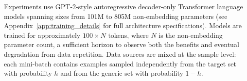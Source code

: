 Experiments use GPT-2-style autoregressive decoder-only Transformer language models spanning sizes from 101M to 805M non-embedding parameters (see Appendix~\ref{app:training_details} for full architecture specifications).
Models are trained for approximately $100 \times N$ tokens, where $N$ is the non-embedding parameter count, a sufficient horizon to observe both the benefits and eventual degradation from data repetition.
Data sources are mixed at the sample level: each mini-batch contains examples sampled independently from the target set with probability $h$ and from the generic set with probability $1-h$.

